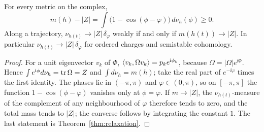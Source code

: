 \begin{proposition}\label{prop:measure}
For every metric on the complex,
\[
 m(h)-|Z|=\int\bigl(1-\cos(\phi-\varphi)\bigr)\,d\nu_h(\phi)\geq0 .
\]
Along a trajectory, $\nu_{h(t)}\to|Z|\,\delta_\varphi$ weakly if and only if
$m(h(t))\to|Z|$. In particular $\nu_{h(t)}\to|Z|\,\delta_\varphi$ for ordered
charges and semistable cohomology.
\end{proposition}

\begin{proof}
For a unit eigenvector $v_k$ of $\Phi$,
$\left\langle v_k,\Omega v_k\right\rangle=p_ke^{\mathrm i\phi_k}$, because
$\Omega=|\Omega|e^{\ii\Phi}$. Hence $\int e^{\mathrm i\phi}d\nu_h=\operatorname{tr}\Omega=Z$ and
$\int d\nu_h=m(h)$; take the real part of $e^{-\ii\varphi}$ times the first
identity. The phases lie in $(-\pi,\pi)$ and $\varphi\in(0,\pi)$, so on
$[-\pi,\pi]$ the function $1-\cos(\phi-\varphi)$ vanishes only at
$\phi=\varphi$. If $m\to|Z|$, the $\nu_{h(t)}$-measure of the complement of
any neighbourhood of $\varphi$ therefore tends to zero, and the total mass
tends to $|Z|$; the converse follows by integrating the constant $1$. The
last statement is Theorem~\ref{thm:relaxation}.
\end{proof}
